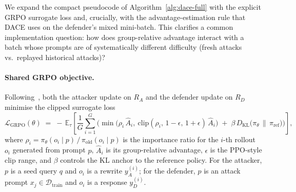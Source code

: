 \documentclass{article}
\newcommand{\method}{\textsc{DACE}\xspace}
\newcommand{\KL}{D_{\mathrm{KL}}}
\begin{document}
We expand the compact pseudocode of Algorithm~\ref{alg:dace-full} with the explicit GRPO surrogate loss and, crucially, with the advantage-estimation rule that \method uses on the defender's mixed mini-batch. This clarifies a common implementation question: how does group-relative advantage interact with a batch whose prompts are of systematically different difficulty (fresh attacks vs.\ replayed historical attacks)?

\paragraph{Shared GRPO objective.} Following~\citet{shao2024grpo, guo2025deepseek}, both the attacker update on $R_A$ and the defender update on $R_D$ minimise the clipped surrogate loss
\begin{equation}
  \mathcal{L}_{\mathrm{GRPO}}(\theta) \;=\; -\,\mathbb{E}_{\tau}\!\left[\frac{1}{G}\sum_{i=1}^{G}\Big(\min\!\big(\rho_i\,\hat A_i,\ \mathrm{clip}(\rho_i,\,1{-}\epsilon,\,1{+}\epsilon)\,\hat A_i\big) \;+\; \beta\,\KL\!\big(\pi_\theta\,\|\,\pi_{\mathrm{ref}}\big)\Big)\right],
  \label{eq:grpo-loss}
\end{equation}
where $\rho_i = \pi_\theta(o_i\mid p)\,/\,\pi_{\mathrm{old}}(o_i\mid p)$ is the importance ratio for the $i$-th rollout $o_i$ generated from prompt $p$, $\hat A_i$ is its group-relative advantage, $\epsilon$ is the PPO-style clip range, and $\beta$ controls the KL anchor to the reference policy. For the attacker, $p$ is a seed query $q$ and $o_i$ is a rewrite $y_A^{(i)}$; for the defender, $p$ is an attack prompt $x_j\in\mathcal{D}_{\mathrm{train}}$ and $o_i$ is a response $y_D^{(i)}$.
\end{document}
